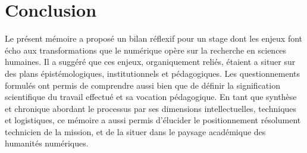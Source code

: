 \documentclass[a4paper,12pt,twoside]{book}
\begin{document}

\chapter*{Conclusion}



Le présent mémoire a proposé un bilan réflexif pour un stage dont les enjeux font écho aux transformations que le numérique opère sur la recherche en sciences humaines. Il a suggéré que ces enjeux, organiquement reliés, étaient a situer sur des plans épistémologiques, institutionnels et pédagogiques. Les questionnements formulés ont permis de comprendre aussi bien  que de définir la signification scientifique du travail effectué et sa vocation pédagogique. En tant que synthèse et chronique abordant le processus par ses dimensions intellectuelles, techniques et logistiques, ce mémoire a aussi permis d'élucider le positionnement résolument technicien de la mission, et de la situer dans le paysage académique des humanités numériques. 
\end{document}
